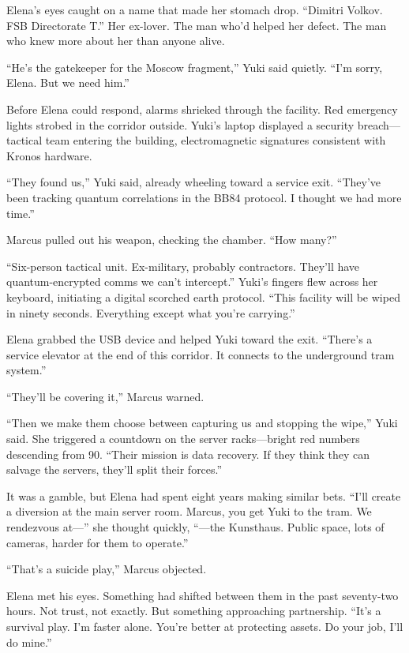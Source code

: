 \documentclass[12pt,letterpaper]{book}
\begin{document}
Elena's eyes caught on a name that made her stomach drop. ``Dimitri Volkov. FSB Directorate T.'' Her ex-lover. The man who'd helped her defect. The man who knew more about her than anyone alive.

``He's the gatekeeper for the Moscow fragment,'' Yuki said quietly. ``I'm sorry, Elena. But we need him.''

Before Elena could respond, alarms shrieked through the facility. Red emergency lights strobed in the corridor outside. Yuki's laptop displayed a security breach---tactical team entering the building, electromagnetic signatures consistent with Kronos hardware.

``They found us,'' Yuki said, already wheeling toward a service exit. ``They've been tracking quantum correlations in the BB84 protocol. I thought we had more time.''

Marcus pulled out his weapon, checking the chamber. ``How many?''

``Six-person tactical unit. Ex-military, probably contractors. They'll have quantum-encrypted comms we can't intercept.'' Yuki's fingers flew across her keyboard, initiating a digital scorched earth protocol. ``This facility will be wiped in ninety seconds. Everything except what you're carrying.''

Elena grabbed the USB device and helped Yuki toward the exit. ``There's a service elevator at the end of this corridor. It connects to the underground tram system.''

``They'll be covering it,'' Marcus warned.

``Then we make them choose between capturing us and stopping the wipe,'' Yuki said. She triggered a countdown on the server racks---bright red numbers descending from 90. ``Their mission is data recovery. If they think they can salvage the servers, they'll split their forces.''

It was a gamble, but Elena had spent eight years making similar bets. ``I'll create a diversion at the main server room. Marcus, you get Yuki to the tram. We rendezvous at---'' she thought quickly, ``---the Kunsthaus. Public space, lots of cameras, harder for them to operate.''

``That's a suicide play,'' Marcus objected.

Elena met his eyes. Something had shifted between them in the past seventy-two hours. Not trust, not exactly. But something approaching partnership. ``It's a survival play. I'm faster alone. You're better at protecting assets. Do your job, I'll do mine.''
\end{document}
